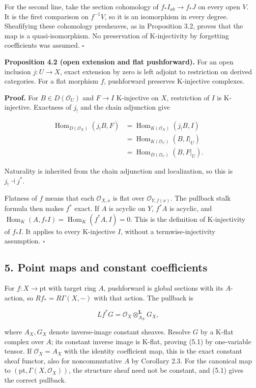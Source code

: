 \documentclass[
  english,
  11pt,
  a4paper,
]{article}
\begin{document}
For the second line, take the section cohomology of
\(f_*I_{ab}\to f_*J\) on every open \(V\). It is the first comparison on
\(f^{-1}V\), so it is an isomorphism in every degree. Sheafifying these
cohomology presheaves, as in Proposition 3.2, proves that the map is a
quasi-isomorphism. No preservation of K-injectivity by forgetting
coefficients was assumed. \(\square\)

\textbf{Proposition 4.2 (open extension and flat pushforward).} For an
open inclusion \(j:U\to X\), exact extension by zero is left adjoint to
restriction on derived categories. For a flat morphism \(f\),
pushforward preserves K-injective complexes.

\textbf{Proof.} For \(B\in D(\mathcal O_U)\) and \(F\to I\) K-injective
on \(X\), restriction of \(I\) is K-injective. Exactness of \(j_!\) and
the chain adjunction give

\[\begin{aligned}
\operatorname{Hom}_{D(\mathcal O_X)}(j_!B,F)
&=\operatorname{Hom}_{K(\mathcal O_X)}(j_!B,I)\\
&=\operatorname{Hom}_{K(\mathcal O_U)}(B,I|_U)\\
&=\operatorname{Hom}_{D(\mathcal O_U)}(B,F|_U).
\end{aligned}\]

Naturality is inherited from the chain adjunction and localization, so
this is \(j_!\dashv j^*\).

Flatness of \(f\) means that each \(\mathcal O_{X,x}\) is flat over
\(\mathcal O_{Y,f(x)}\). The pullback stalk formula then makes \(f^*\)
exact. If \(A\) is acyclic on \(Y\), \(f^*A\) is acyclic, and
\(\operatorname{Hom}_K(A,f_*I)=\operatorname{Hom}_K(f^*A,I)=0\). This is
the definition of K-injectivity of \(f_*I\). It applies to every
K-injective \(I\), without a termwise-injectivity assumption.
\(\square\)

\subsection{5. Point maps and constant
coefficients}\label{derived-pullback-and-pushforward--5-point-maps-and-constant-coefficients}

For \(f:X\to\mathrm{pt}\) with target ring \(A\), pushforward is global
sections with its \(A\)-action, so \(Rf_*=R\Gamma(X,-)\) with that
action. The pullback is

\[Lf^*G=\mathcal O_X\otimes_{A_X}^{\mathbf L}G_X,
\tag{5.1}\]

where \(A_X,G_X\) denote inverse-image constant sheaves. Resolve \(G\)
by a K-flat complex over \(A\); its constant inverse image is K-flat,
proving (5.1) by one-variable tensor. If \(\mathcal O_X=A_X\) with the
identity coefficient map, this is the exact constant sheaf functor, also
for noncommutative \(A\) by Corollary 2.3. For the canonical map to
\((\mathrm{pt},\Gamma(X,\mathcal O_X))\), the structure sheaf need not
be constant, and (5.1) gives the correct pullback.
\end{document}
